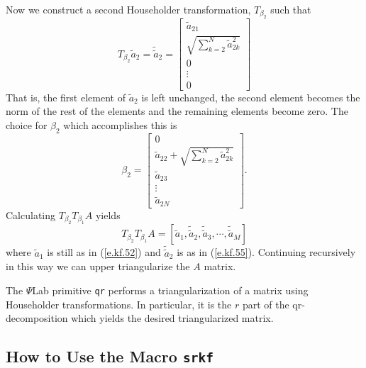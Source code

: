	Now we construct a second Householder transformation,
$T_{\beta_2}$ such that
%
\begin{equation}
T_{\beta_2}\tilde{a}_2=\tilde{\tilde{a}}_2=
                          \left[\begin{array}{c}
                          \tilde{a}_{21}\\
                          \sqrt{\sum_{k=2}^{N}\tilde{a}_{2k}^2}\\
                          0\\
                          \vdots\\
                          0
                      \end{array}\right]
\label{e.kf.55}
\end{equation}
%
That is, the first element of $\tilde{a}_2$ is left unchanged,
the second element becomes the norm of the rest of the elements and
the remaining elements become zero.  The choice for $\beta_2$ which
accomplishes this is
%
\begin{equation}
\beta_2=\left[\begin{array}{c}
                      0\\    
                      \tilde{a}_{22}+\sqrt{\sum_{k=2}^{N}\tilde{a}_{2k}^2}\\
                          \tilde{a}_{23}\\
                          \vdots\\
                          \tilde{a}_{2N}
                      \end{array}\right].
\label{e.kf.56}
\end{equation}
%
Calculating $T_{\beta_2}T_{\beta_1}A$ yields
%
\begin{equation}
T_{\beta_2}T_{\beta_1}A=[\tilde{a}_1,\tilde{\tilde{a}}_2,
                                     \tilde{\tilde{a}}_3,
                                     \cdots,
                                     \tilde{\tilde{a}}_M]
\label{e.kf.57}
\end{equation}
%
where $\tilde{a}_1$ is still as in (\ref{e.kf.52}) and $\tilde{\tilde{a}}_2$
is as in (\ref{e.kf.55}).  Continuing recursively in this way we can
upper triangularize the $A$ matrix.

	The $\Psi$Lab primitive {\tt qr} performs a triangularization of
a matrix using Householder transformations.  In particular, it is
the $r$ part of the qr-decomposition which yields the 
desired triangularized matrix.

\subsection{How to Use the Macro {\tt srkf}}

